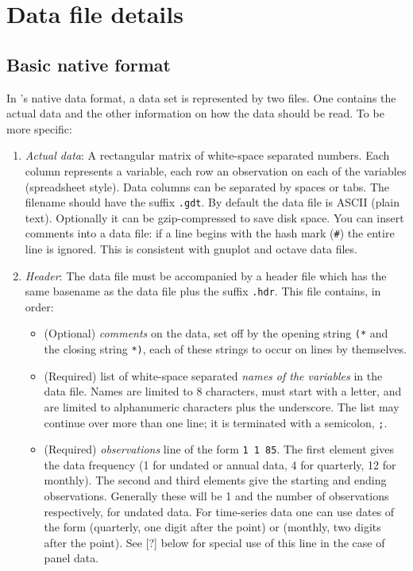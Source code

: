 \chapter{Data file details}
\label{app-datafile}



\section{Basic native format}
\label{native}

In 's native data format,
	a data set is represented by two files.  One contains the
	actual data and the other information on how the data should
	be read.  To be more specific:


\begin{enumerate}
\item \emph{Actual data}: A
	    rectangular matrix of white-space separated numbers.  Each
	    column represents a variable, each row an observation on
	    each of the variables (spreadsheet style). Data columns
	    can be separated by spaces or tabs. The filename should
	    have the suffix \verb+.gdt+.  By default the
	    data file is ASCII (plain text).  Optionally it can be
	    gzip-compressed to save disk space. You can insert
	    comments into a data file: if a line begins with the hash
	    mark (\verb+#+) the entire line is
	    ignored. This is consistent with gnuplot and octave data
	    files.


\item \emph{Header}: The data file
	    must be accompanied by a header file which has the same
	    basename as the data file plus the suffix
	    \verb+.hdr+.  This file contains, in
	    order:


\begin{itemize}
\item (Optional) \emph{comments}
		on the data, set off by the opening string
		\verb+(*+ and the closing string
		\verb+*)+, each of these strings to occur
		on lines by themselves.


\item (Required) list of white-space separated
		\emph{names of the variables} in the
		data file. Names are limited to 8 characters, must
		start with a letter, and are limited to alphanumeric
		characters plus the underscore.  The list may continue
		over more than one line; it is terminated with a
		semicolon, \verb+;+.


\item (Required) \emph{observations} line of
		the form \verb+1 1 85+.  The first element
		gives the data frequency (1 for undated or annual
		data, 4 for quarterly, 12 for monthly).  The second
		and third elements give the starting and ending
		observations. Generally these will be 1 and the number
		of observations respectively, for undated data.  For
		time-series data one can use dates of the form
		 (quarterly, one digit after
		the point) or  (monthly, two
		digits after the point). See [?] below
		for special use of this line in the case of panel
		data.



\end{itemize}
\end{enumerate}
